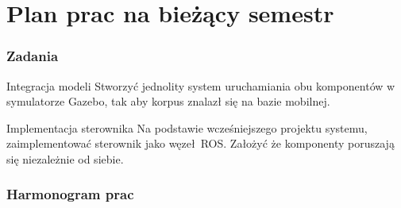 \section{Plan prac na bieżący semestr}

\begin{frame}
	\frametitle{Zadania}
	\begin{block}{Integracja modeli}
	Stworzyć jednolity system uruchamiania obu komponentów w symulatorze
	Gazebo, tak aby korpus znalazł się na bazie mobilnej.
	\end{block}
	\medskip
	\begin{block}{Implementacja sterownika}
	Na podstawie wcześniejszego projektu systemu, zaimplementować 
	sterownik jako węzeł ROS. Założyć że komponenty poruszają się 
	niezależnie od siebie.
	\end{block}
\end{frame}



\begin{frame}
	\frametitle{Harmonogram prac}
	\centering
	\begin{ganttchart}{1}{18}
		 \ganttnewline
		 \ganttnewline
		 \ganttnewline
		 \ganttnewline
		   \ganttnewline
		  
		\end{ganttchart}
\end{frame}

